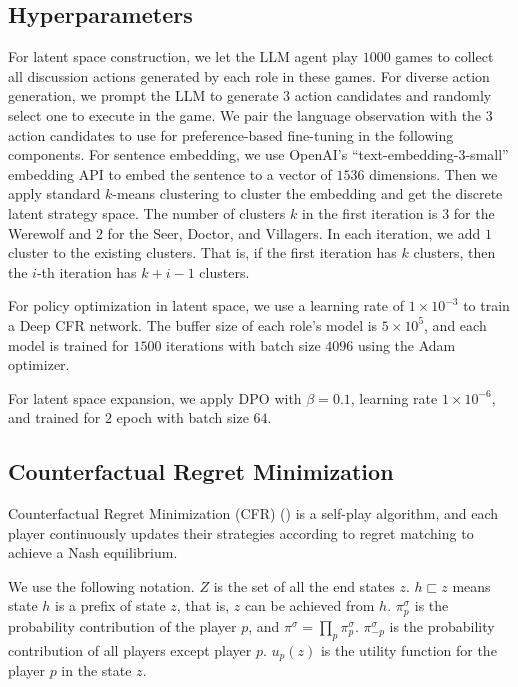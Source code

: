 \subsection{Hyperparameters}

For latent space construction, we let the LLM agent play $1000$ games to collect all discussion actions generated by each role in these games. For diverse action generation, we prompt the LLM to generate $3$ action candidates and randomly select one to execute in the game. We pair the language observation with the $3$ action candidates to use for preference-based fine-tuning in the following components. For sentence embedding, we use OpenAI's ``text-embedding-3-small'' embedding API to embed the sentence to a vector of $1536$ dimensions. Then we apply standard $k$-means clustering to cluster the embedding and get the discrete latent strategy space. The number of clusters $k$ in the first iteration is $3$ for the Werewolf and $2$ for the Seer, Doctor, and Villagers. In each iteration, we add $1$ cluster to the existing clusters. That is, if the first iteration has $k$ clusters, then the $i$-th iteration has $k + i - 1$ clusters.

For policy optimization in latent space, we use a learning rate of $1\times10^{-3}$ to train a Deep CFR network. The buffer size of each role's model is $5\times10^5$, and each model is trained for $1500$ iterations with batch size $4096$ using the Adam optimizer. 

For latent space expansion, we apply DPO with $\beta=0.1$, learning rate $1\times10^{-6}$, and trained for $2$ epoch with batch size $64$.


\subsection{Counterfactual Regret Minimization}

Counterfactual Regret Minimization (CFR) (\cite{zinkevich2007regret}) is a self-play algorithm, and each player continuously updates their strategies according to regret matching to achieve a Nash equilibrium.

We use the following notation. $Z$ is the set of all the end states $z$. $h\sqsubset z$ means state $h$ is a prefix of state $z$, that is, $z$ can be achieved from $h$. $\pi_p^\sigma$ is the probability contribution of the player $p$, and $\pi^\sigma = \prod_p \pi_p^\sigma$. $\pi_{-p}^\sigma$ is the probability contribution of all players except player $p$. $u_p(z)$ is the utility function for the player $p$ in the state $z$.

